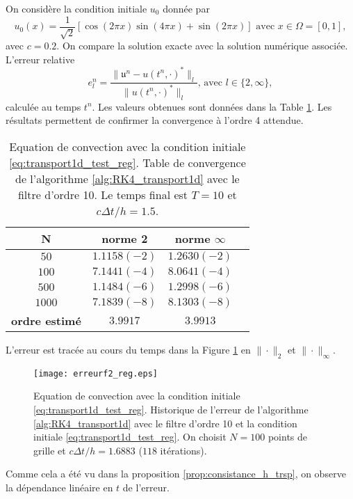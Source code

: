 On considère la condition initiale $u_0$ donnée par 
\begin{equation}
u_0(x) = \dfrac{1}{\sqrt{2}} \left[ \cos (2 \pi x) \sin (4 \pi x) + \sin ( 2 \pi x ) \right] \text{ avec } x \in \Omega = [0,1],
\label{eq:transport1d_test_reg}
\end{equation}
avec $c=0.2$. On compare la solution exacte avec la solution numérique associée. L'erreur relative
\begin{equation}
e_l^n = \dfrac{\| \mathfrak{u}^n - u(t^n,\cdot)^* \|_l}{\| u(t^n, \cdot)^* \|_l} \text{, avec } l \in \lbrace 2, \infty \rbrace,
\end{equation}
calculée au temps $t^n$. Les valeurs obtenues sont données dans la Table \ref{tab:rate_transport1d_test_reg}. Les résultats permettent de confirmer la convergence à l'ordre 4 attendue.
\begin{table}[htbp]
\begin{center}
\begin{tabular}{|c||c|c|c|}
\hline
\textbf{N}  & \textbf{norme 2} & \textbf{norme $\infty$} \\
\hline
\hline
$50$   & $1.1158(-2)$  & $1.2630(-2)$  \\
$100$  & $7.1441(-4)$  & $8.0641(-4)$  \\
$500$  & $1.1484(-6)$  & $1.2998(-6)$  \\
$1000$ & $7.1839(-8)$  & $8.1303(-8)$  \\
\hline 
\hline
\textbf{ordre estimé}& $3.9917$ & $3.9913$\\
\hline
\end{tabular}
\end{center}
\caption{Equation de convection avec la condition initiale \eqref{eq:transport1d_test_reg}. Table de convergence de l'algorithme \ref{alg:RK4_transport1d} avec le filtre d'ordre 10. Le temps final est $T=10$ et $c \Delta t/h=1.5$.}
\label{tab:rate_transport1d_test_reg}
\end{table} 
L'erreur est tracée au cours du temps dans la Figure \ref{fig:transport1d_test_reg} en $\| \cdot \|_2$ et $\| \cdot \|_{\infty}$.
\begin{figure}[htbp]
\begin{center}
\texttt{[image: erreurf2\_reg.eps]}
\end{center}
\caption{Equation de convection avec la condition initiale \eqref{eq:transport1d_test_reg}. Historique de l'erreur de l'algorithme \ref{alg:RK4_transport1d} avec le filtre d'ordre 10 et la condition initiale \eqref{eq:transport1d_test_reg}. On choisit $N=100$ points de grille et $c \Delta t/h = 1.6883$ ($118$ itérations).}
\label{fig:transport1d_test_reg}
\end{figure}
Comme cela a été vu dans la proposition \ref{prop:consistance_h_trsp}, on observe la dépendance linéaire en $t$ de l'erreur.









